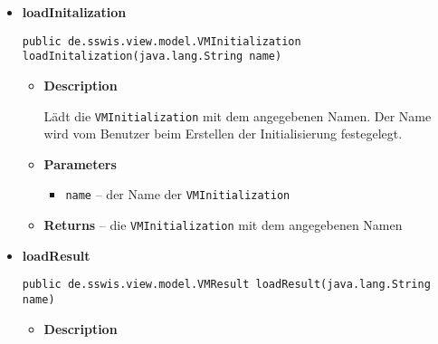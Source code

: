 {{{{{{\begin{itemize}
{\begin{itemize}
{Lädt das \texttt{\small VMGame} mit dem angegebenen Namen. Der Name wird vom Benutzer beim Erstellen des Stufenspiels festegelegt.
}
\item{
{\bf  Parameters}
  \begin{itemize}
   \item{
\texttt{name} -- der Name des \texttt{\small VMGame}}
  \end{itemize}
}%
\item{{\bf  Returns} -- 
das \texttt{\small VMGame} mit dem angegebenen Namen 
}%
\end{itemize}
}%
\item{ 
\hypertarget{de.sswis.controller.FileManager.loadInitalization(java.lang.String)}{{\bf  loadInitalization}\\}
\begin{lstlisting}[frame=none]
public de.sswis.view.model.VMInitialization loadInitalization(java.lang.String name)\end{lstlisting} %
\begin{itemize}
\item{
{\bf  Description}

Lädt die \texttt{\small VMInitialization} mit dem angegebenen Namen. Der Name wird vom Benutzer beim Erstellen der Initialisierung festegelegt.
}
\item{
{\bf  Parameters}
  \begin{itemize}
   \item{
\texttt{name} -- der Name der \texttt{\small VMInitialization}}
  \end{itemize}
}%
\item{{\bf  Returns} -- 
die \texttt{\small VMInitialization} mit dem angegebenen Namen 
}%
\end{itemize}
}%
\item{ 
\hypertarget{de.sswis.controller.FileManager.loadResult(java.lang.String)}{{\bf  loadResult}\\}
\begin{lstlisting}[frame=none]
public de.sswis.view.model.VMResult loadResult(java.lang.String name)\end{lstlisting} %
\begin{itemize}
\item{
{\bf  Description}

}
\end{itemize}}
\end{itemize}}}}}}}
